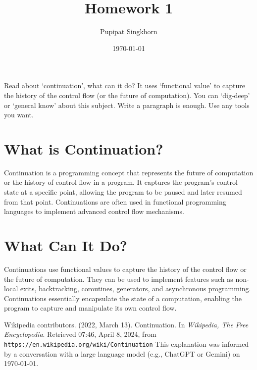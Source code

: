 \documentclass{article}
\begin{document}
\title{Homework 1}
\author{Pupipat Singkhorn}
\date{\today}
\maketitle

Read about `continuation', what can it do? It uses `functional value' to capture the history of the control flow (or the future of computation). You can `dig-deep' or `general know' about this subject. Write a paragraph is enough. Use any tools you want.

\section*{What is Continuation?}
\quad Continuation is a programming concept that represents the future of computation or the history of control flow in a program. It captures the program's control state at a specific point, allowing the program to be paused and later resumed from that point. Continuations are often used in functional programming languages to implement advanced control flow mechanisms.

\section*{What Can It Do?}
\quad Continuations use functional values to capture the history of the control flow or the future of computation. They can be used to implement features such as non-local exits, backtracking, coroutines, generators, and asynchronous programming. Continuations essentially encapsulate the state of a computation, enabling the program to capture and manipulate its own control flow.

\begin{thebibliography}{9}
Wikipedia contributors. (2022, March 13). Continuation. In \textit{Wikipedia, The Free Encyclopedia}. Retrieved 07:46, April 8, 2024, from \texttt{https://en.wikipedia.org/wiki/Continuation}
\bibitem{}
This explanation was informed by a conversation with a large language model (e.g., ChatGPT or Gemini) on \today.
\end{thebibliography}
\end{document}
